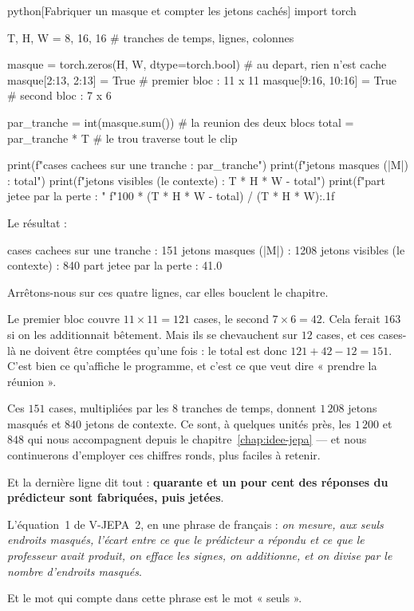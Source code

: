 \begin{code}{python}[Fabriquer un masque et compter les jetons cachés]
import torch

T, H, W = 8, 16, 16          # tranches de temps, lignes, colonnes

masque = torch.zeros(H, W, dtype=torch.bool)   # au depart, rien n'est cache
masque[2:13, 2:13] = True                      # premier bloc : 11 x 11
masque[9:16, 10:16] = True                     # second bloc  :  7 x  6

par_tranche = int(masque.sum())      # la reunion des deux blocs
total = par_tranche * T              # le trou traverse tout le clip

print(f"cases cachees sur une tranche : {par_tranche}")
print(f"jetons masques  (|M|)         : {total}")
print(f"jetons visibles (le contexte) : {T * H * W - total}")
print(f"part jetee par la perte       : "
      f"{100 * (T * H * W - total) / (T * H * W):.1f} %
\end{code}

Le résultat :

\begin{sortie}
cases cachees sur une tranche : 151
jetons masques  (|M|)         : 1208
jetons visibles (le contexte) : 840
part jetee par la perte       : 41.0 %
\end{sortie}

Arrêtons-nous sur ces quatre lignes, car elles bouclent le chapitre.

Le premier bloc couvre $11 \times 11 = 121$ cases, le second $7 \times 6 =
42$. Cela ferait $163$ si on les additionnait bêtement. Mais ils se
chevauchent sur $12$ cases, et ces cases-là ne doivent être comptées qu'une
fois : le total est donc $121 + 42 - 12 = 151$. C'est bien ce qu'affiche le
programme, et c'est ce que veut dire « prendre la réunion ».

Ces $151$ cases, multipliées par les $8$ tranches de temps, donnent $1\,208$
jetons masqués et $840$ jetons de contexte. Ce sont, à quelques unités près,
les $1\,200$ et $848$ qui nous accompagnent depuis le
chapitre~\ref{chap:idee-jepa} — et nous continuerons d'employer ces
chiffres ronds, plus faciles à retenir.

Et la dernière ligne dit tout : \textbf{quarante et un pour cent des réponses
du prédicteur sont fabriquées, puis jetées}.

\begin{aretenir}
L'équation~1 de V-JEPA~2, en une phrase de français : \emph{on mesure, aux
seuls endroits masqués, l'écart entre ce que le prédicteur a répondu et ce
que le professeur avait produit, on efface les signes, on additionne, et on
divise par le nombre d'endroits masqués}.

Et le mot qui compte dans cette phrase est le mot « seuls ».
\end{aretenir}

